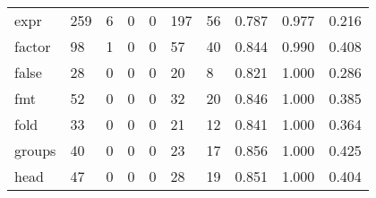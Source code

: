 \begin{longtable}{lp{2.0cm}p{2.0cm}p{2.0cm}p{2.0cm}p{2.0cm}p{2.0cm}p{2.0cm}p{2.0cm}p{2.0cm}}
expr      &                    259 &                                             6 &                                            0 &                                           0 &                                          197 &                                         56 &                                0.787 &                                  0.977 &                                0.216 \\
factor    &                     98 &                                             1 &                                            0 &                                           0 &                                           57 &                                         40 &                                0.844 &                                  0.990 &                                0.408 \\
false     &                     28 &                                             0 &                                            0 &                                           0 &                                           20 &                                          8 &                                0.821 &                                  1.000 &                                0.286 \\
fmt       &                     52 &                                             0 &                                            0 &                                           0 &                                           32 &                                         20 &                                0.846 &                                  1.000 &                                0.385 \\
fold      &                     33 &                                             0 &                                            0 &                                           0 &                                           21 &                                         12 &                                0.841 &                                  1.000 &                                0.364 \\
groups    &                     40 &                                             0 &                                            0 &                                           0 &                                           23 &                                         17 &                                0.856 &                                  1.000 &                                0.425 \\
head      &                     47 &                                             0 &                                            0 &                                           0 &                                           28 &                                         19 &                                0.851 &                                  1.000 &                                0.404 \\

\end{longtable}
